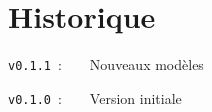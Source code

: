 \documentclass{article}
\begin{document}
\begin{PresentationCode}{}
\end{PresentationCode}

\begin{PresentationCode}{}
\end{PresentationCode}

\begin{PresentationCode}{}
\end{PresentationCode}

\newpage

\part{Historique}

\verb|v0.1.1|~:~~~~Nouveaux modèles

\verb|v0.1.0|~:~~~~Version initiale
\end{document}
